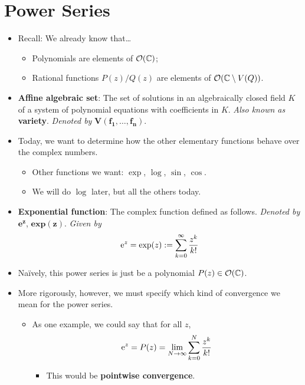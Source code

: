 \documentclass[../notes.tex]{subfiles}
\begin{document}
\section{Power Series}
\begin{itemize}
    \item {}Recall: We already know that\dots
    \begin{itemize}
        \item Polynomials are elements of $\mathcal{O}(\C)$;
        \item Rational functions $P(z)/Q(z)$ are elements of $\mathcal{O}(\C\setminus V(Q))$.
    \end{itemize}
    \item \textbf{Affine algebraic set}: The set of solutions in an algebraically closed field $K$ of a system of polynomial equations with coefficients in $K$. \emph{Also known as} \textbf{variety}. \emph{Denoted by} $\bm{V(f_1,\ldots,f_n)}$.
    \item Today, we want to determine how the other elementary functions behave over the complex numbers.
    \begin{itemize}
        \item Other functions we want: $\exp$, $\log$, $\sin$, $\cos$.
        \item We will do $\log$ later, but all the others today.
    \end{itemize}
    \item \textbf{Exponential function}: The complex function defined as follows. \emph{Denoted by} $\textbf{e}^{\bm{z}}$, $\textbf{exp}\bm{(z)}$. \emph{Given by}
    \begin{equation*}
        \e[z] = \exp(z) := \sum_{k=0}^\infty\frac{z^k}{k!}
    \end{equation*}
    \item Na\"{i}vely, this power series is just be a polynomial $P(z)\in\mathcal{O}(\C)$.
    \item More rigorously, however, we must specify which kind of convergence we mean for the power series.
    \begin{itemize}
        \item As one example, we could say that for all $z$,
        \begin{equation*}
            \e[z] = P(z) = \lim_{N\to\infty}\sum_{k=0}^N\frac{z^k}{k!}
        \end{equation*}
        \begin{itemize}
            \item This would be \textbf{pointwise convergence}.

\end{itemize}
\end{itemize}
\end{itemize}
\end{document}
